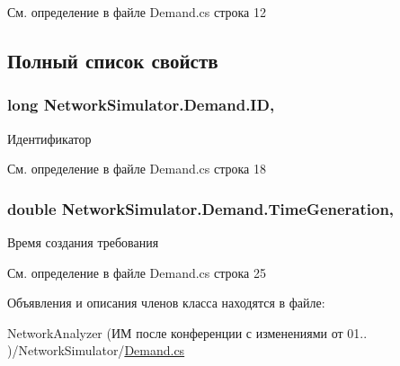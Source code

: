 См. определение в файле Demand.\+cs строка 12



\subsection{Полный список свойств}
\subsubsection[{\texorpdfstring{ID}{ID}}]{\setlength{\rightskip}{0pt plus 5cm}long Network\+Simulator.\+Demand.\+ID\hspace{0.3cm}{\ttfamily [get]}, {\ttfamily [set]}}\hypertarget{class_network_simulator_1_1_demand_af9ba0cb40b82eb7be679676425cad207}{}\label{class_network_simulator_1_1_demand_af9ba0cb40b82eb7be679676425cad207}


Идентификатор 



См. определение в файле Demand.\+cs строка 18

\subsubsection[{\texorpdfstring{Time\+Generation}{TimeGeneration}}]{\setlength{\rightskip}{0pt plus 5cm}double Network\+Simulator.\+Demand.\+Time\+Generation\hspace{0.3cm}{\ttfamily [get]}, {\ttfamily [set]}}\hypertarget{class_network_simulator_1_1_demand_abd1660da7871505ae8ad8dd282dc3d29}{}\label{class_network_simulator_1_1_demand_abd1660da7871505ae8ad8dd282dc3d29}


Время создания требования 



См. определение в файле Demand.\+cs строка 25



Объявления и описания членов класса находятся в файле\+:\begin{DoxyCompactItemize}
\item 
Network\+Analyzer (ИМ после конференции  с изменениями от 01.. )/\+Network\+Simulator/\hyperlink{_demand_8cs}{Demand.\+cs}\end{DoxyCompactItemize}
